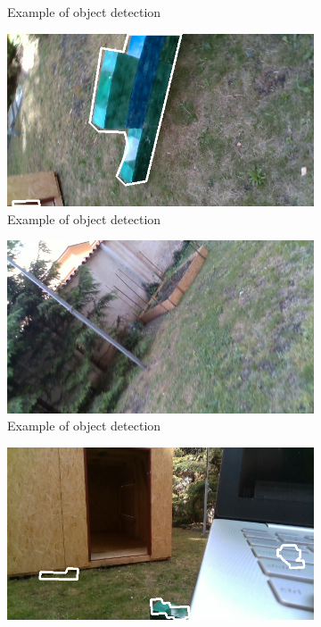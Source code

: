 \documentclass{ctuthesis}
\begin{document}
\begin{figure}[htbp]
\begin{subfigure}{0.475\textwidth}
         \caption{Example of object detection}
         \label{fig:y3}
     \end{subfigure}
          \hfill
     \begin{subfigure}{0.475\textwidth}
         \centering
         \includegraphics[width=\textwidth]{NN_3.png}
         \caption{Example of object detection}
         \label{fig:y4}
     \end{subfigure}
          \hfill
     \begin{subfigure}{0.475\textwidth}
         \centering
         \includegraphics[width=\textwidth]{NN_6.png}
         \caption{Example of object detection}
         \label{fig:y5}
     \end{subfigure}
               \hfill
     \begin{subfigure}{0.475\textwidth}
         \centering
         \includegraphics[width=\textwidth]{NN_5.png}

\end{subfigure}
\end{figure}
\end{document}

